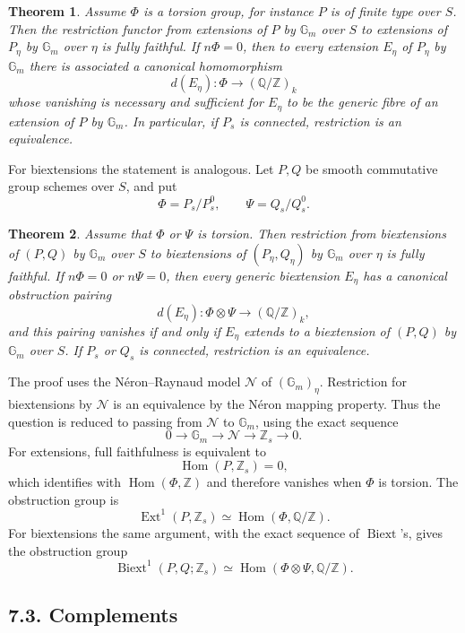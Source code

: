 \documentclass[11pt]{article}
\theoremstyle{plain}
\newtheorem{theorem}{Theorem}[section]
\theoremstyle{definition}
\theoremstyle{remark}
\newcommand{\bQ}{\mathbb Q}
\newcommand{\bZ}{\mathbb Z}
\DeclareMathOperator{\Hom}{Hom}
\DeclareMathOperator{\Ext}{Ext}
\DeclareMathOperator{\Biext}{Biext}
\newcommand{\Gm}{\mathbb G_m}
\begin{document}
\begin{theorem}
Assume \(\Phi\) is a torsion group, for instance \(P\) is of finite type over
\(S\). Then the restriction functor from extensions of \(P\) by \(\Gm\) over
\(S\) to extensions of \(P_\eta\) by \(\Gm\) over \(\eta\) is fully faithful.
If \(n\Phi=0\), then to every extension \(E_\eta\) of \(P_\eta\) by
\(\Gm\) there is associated a canonical homomorphism
\[
d(E_\eta):\Phi\longrightarrow (\bQ/\bZ)_k
\]
whose vanishing is necessary and sufficient for \(E_\eta\) to be the generic
fibre of an extension of \(P\) by \(\Gm\). In particular, if \(P_s\) is
connected, restriction is an equivalence.
\end{theorem}

For biextensions the statement is analogous. Let \(P,Q\) be smooth commutative
group schemes over \(S\), and put
\[
\Phi=P_s/P_s^0,\qquad \Psi=Q_s/Q_s^0.
\]

\begin{theorem}
Assume that \(\Phi\) or \(\Psi\) is torsion. Then restriction from biextensions
of \((P,Q)\) by \(\Gm\) over \(S\) to biextensions of
\((P_\eta,Q_\eta)\) by \(\Gm\) over \(\eta\) is fully faithful. If \(n\Phi=0\)
or \(n\Psi=0\), then every generic biextension \(E_\eta\) has a canonical
obstruction pairing
\[
d(E_\eta):\Phi\otimes\Psi\longrightarrow (\bQ/\bZ)_k,
\]
and this pairing vanishes if and only if \(E_\eta\) extends to a biextension of
\((P,Q)\) by \(\Gm\) over \(S\). If \(P_s\) or \(Q_s\) is connected, restriction
is an equivalence.
\end{theorem}

The proof uses the Néron--Raynaud model \(\mathcal N\) of \((\Gm)_\eta\).
Restriction for biextensions by \(\mathcal N\) is an equivalence by the Néron
mapping property. Thus the question is reduced to passing from
\(\mathcal N\) to \(\Gm\), using the exact sequence
\[
0\longrightarrow \Gm\longrightarrow \mathcal N\longrightarrow \bZ_s
\longrightarrow 0.
\]
For extensions, full faithfulness is equivalent to
\[
\Hom(P,\bZ_s)=0,
\]
which identifies with \(\Hom(\Phi,\bZ)\) and therefore vanishes when \(\Phi\) is
torsion. The obstruction group is
\[
\Ext^1(P,\bZ_s)\simeq \Hom(\Phi,\bQ/\bZ).
\]
For biextensions the same argument, with the exact sequence of \(\Biext\)'s,
gives the obstruction group
\[
\Biext^1(P,Q;\bZ_s)\simeq
\Hom(\Phi\otimes\Psi,\bQ/\bZ).
\]

\subsection*{7.3. Complements}
\end{document}
